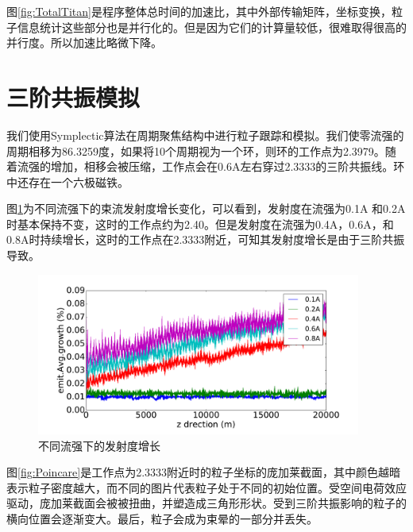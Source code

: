 图\ref{fig:TotalTitan}是程序整体总时间的加速比，其中外部传输矩阵，坐标变换，粒子信息统计这些部分也是并行化的。但是因为它们的计算量较低，很难取得很高的并行度。所以加速比略微下降。

\section{三阶共振模拟}            \label{section:3rd_order_simulation}
我们使用Symplectic算法在周期聚焦结构中进行粒子跟踪和模拟。我们使零流强的周期相移为86.3259度，如果将10个周期视为一个环，则环的工作点为2.3979。随着流强的增加，相移会被压缩，工作点会在0.6A左右穿过2.3333的三阶共振线。环中还存在一个六极磁铁。

图\ref{fig:emitGrowthCompare}为不同流强下的束流发射度增长变化，可以看到，发射度在流强为0.1A 和0.2A 时基本保持不变，这时的工作点约为2.40。但是发射度在流强为0.4A，0.6A，和0.8A时持续增长，这时的工作点在2.3333附近，可知其发射度增长是由于三阶共振导致。

\begin{figure}[!htb]
    \centering
    \includegraphics[width=0.95\textwidth]{Img/SymplecticEmitGrowthCompare.pdf}
    \caption{不同流强下的发射度增长}
    \label{fig:emitGrowthCompare}
\end{figure}

图\ref{fig:Poincare}是工作点为2.3333附近时的粒子坐标的庞加莱截面，其中颜色越暗表示粒子密度越大，而不同的图片代表粒子处于不同的初始位置。受空间电荷效应驱动，庞加莱截面会被被扭曲，并塑造成三角形形状。受到三阶共振影响的粒子的横向位置会逐渐变大。最后，粒子会成为束晕的一部分并丢失。

